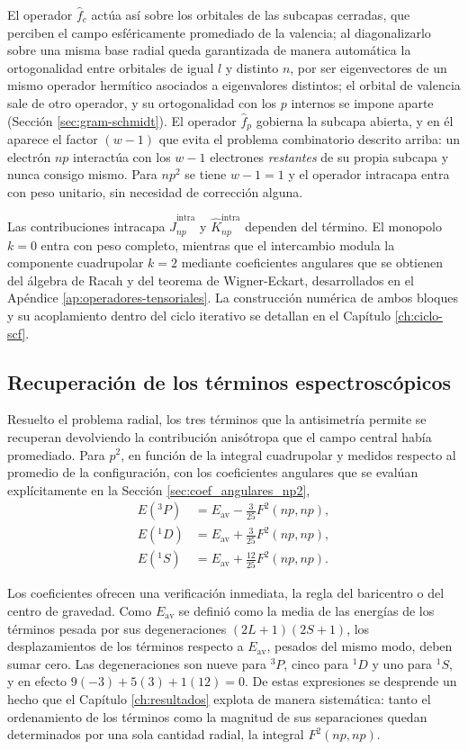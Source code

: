 El operador $\hat{f}_c$ actúa así sobre los orbitales de las subcapas cerradas, que perciben el campo esféricamente promediado de la valencia; al diagonalizarlo sobre una misma base radial queda garantizada de manera automática la ortogonalidad entre orbitales de igual $l$ y distinto $n$, por ser eigenvectores de un mismo operador hermítico asociados a eigenvalores distintos; el orbital de valencia sale de otro operador, y su ortogonalidad con los $p$ internos se impone aparte (Sección \ref{sec:gram-schmidt}). El operador $\hat{f}_p$ gobierna la subcapa abierta, y en él aparece el factor $(w-1)$ que evita el problema combinatorio descrito arriba: un electrón $np$ interactúa con los $w-1$ electrones \textit{restantes} de su propia subcapa y nunca consigo mismo. Para $np^2$ se tiene $w-1 = 1$ y el operador intracapa entra con peso unitario, sin necesidad de corrección alguna.

Las contribuciones intracapa $\hat{J}_{np}^{\text{intra}}$ y $\hat{K}_{np}^{\text{intra}}$ dependen del término. El monopolo $k=0$ entra con peso completo, mientras que el intercambio modula la componente cuadrupolar $k=2$ mediante coeficientes angulares que se obtienen del álgebra de Racah y del teorema de Wigner-Eckart, desarrollados en el Apéndice \ref{ap:operadores-tensoriales}. La construcción numérica de ambos bloques y su acoplamiento dentro del ciclo iterativo se detallan en el Capítulo \ref{ch:ciclo-scf}.

\subsection{Recuperación de los términos espectroscópicos}

Resuelto el problema radial, los tres términos que la antisimetría permite se recuperan devolviendo la contribución anisótropa que el campo central había promediado. Para $p^2$, en función de la integral cuadrupolar y medidos respecto al promedio de la configuración, con los coeficientes angulares que se evalúan explícitamente en la Sección \ref{sec:coef_angulares_np2},
\begin{align}
    E(^3P) &= E_{\text{av}} - \frac{3}{25}F^2(np,np), \label{eq:termino_3P}\\
    E(^1D) &= E_{\text{av}} + \frac{3}{25}F^2(np,np), \label{eq:termino_1D}\\
    E(^1S) &= E_{\text{av}} + \frac{12}{25}F^2(np,np). \label{eq:termino_1S}
\end{align}

Los coeficientes ofrecen una verificación inmediata, la regla del baricentro o del centro de gravedad. Como $E_{\text{av}}$ se definió como la media de las energías de los términos pesada por sus degeneraciones $(2L+1)(2S+1)$, los desplazamientos de los términos respecto a $E_{\text{av}}$, pesados del mismo modo, deben sumar cero. Las degeneraciones son nueve para $^3P$, cinco para $^1D$ y uno para $^1S$, y en efecto $9(-3) + 5(3) + 1(12) = 0$. De estas expresiones se desprende un hecho que el Capítulo \ref{ch:resultados} explota de manera sistemática: tanto el ordenamiento de los términos como la magnitud de sus separaciones quedan determinados por una sola cantidad radial, la integral $F^2(np,np)$.

